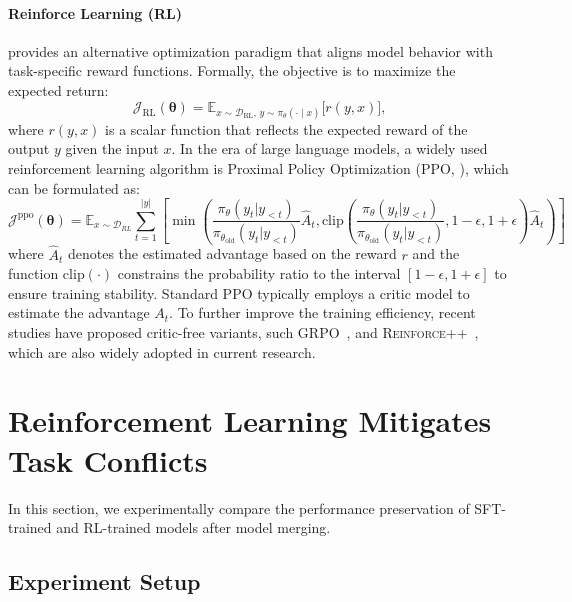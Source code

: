 \documentclass{article} %
\begin{document}
\paragraph{Reinforce Learning (RL)} provides an alternative optimization paradigm that aligns model behavior with task-specific reward functions.  
Formally, the objective is to maximize the expected return:
\begin{equation}
    \mathcal{J}_{\text{RL}}(\bm{\theta}) = \mathbb{E}_{x\sim \mathcal{D}_{\text{RL}},\, y \sim \pi_\theta(\cdot \mid x)} \big[ r(y, x) \big],
\end{equation}
where $r(y,x)$ is a scalar function that reflects the expected reward of the output $y$ given the input $x$. In the era of large language models, a widely used reinforcement learning algorithm is Proximal Policy Optimization (PPO, \cite{schulman2017proximal}), which can be formulated as:
\begin{equation}
\mathcal{J}^{\text{ppo}}(\bm{\theta}) = \mathbb{E}_{x\sim\mathcal{D}_{RL}} \sum_{t=1}^{|y|} \left[
    \min \left(
        \frac{\pi_\theta(y_{t}|y_{<t})}{\pi_{\theta_{\text{old}}}(y_{t}|y_{<t})} \hat{A}_t,
        \mathrm{clip}\left(\frac{\pi_\theta(y_{t}|y_{<t})}{\pi_{\theta_{\text{old}}}(y_{t}|y_{<t})}, 1 - \epsilon, 1 + \epsilon\right) \hat{A}_t
    \right)
\right]
\end{equation}
where $\hat{A}_t$ denotes the estimated advantage based on the reward 
$r$ and the function $\mathrm{clip}(\cdot)$ constrains the probability ratio to the interval $[1-\epsilon, 1+\epsilon]$ to ensure training stability. Standard PPO typically employs a critic model to estimate the advantage $A_{t}$. To further improve the training efficiency, recent studies have proposed critic-free variants, such GRPO~\citep{shao2024deepseekmath}, and \textsc{Reinforce++}~\citep{ahmadian2024back}, which are also widely adopted in current research.



\section{Reinforcement Learning Mitigates Task Conflicts}
In this section, we experimentally compare the performance preservation of SFT-trained and RL-trained models after model merging.
\subsection{Experiment Setup}
\end{document}
